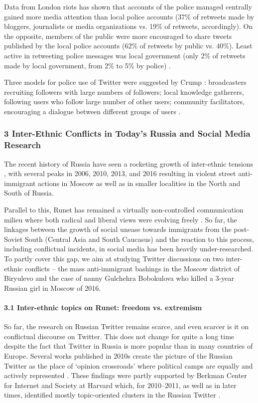 Data from London riots \cite{PalenViewegAnderson} has shown that accounts of the police managed centrally gained more media attention than local police accounts (37\% of retweets made by bloggers, journalists or media organizations vs. 19\% of retweets, accordingly). On the opposite, members of the public were more encouraged to share tweets published by the local police accounts (62\% of retweets by public vs. 40\%). Least active in retweeting police messages was local government (only 2\% of retweets made by local government, from 2\% to 5\% by police) \cite[p.~427]{PanagiotopoulosBarnettBigdeli}.

Three models for police use of Twitter were suggested by Crump \cite{Crowe}: broadcasters recruiting followers with large numbers of followers; local knowledge gatherers, following users who follow large number of other users; community facilitators, encouraging a dialogue between different groups of users \cite{PalenViewegAnderson}.

\subsubsection{3 Inter-Ethnic Conflicts in Today’s Russia and Social Media Research}

The recent history of Russia have seen a rocketing growth of inter-ethnic tensions \cite{BodrunovaBlekanovMaksimov,BodrunovaLitvinenkoGavraYakunin}, with several peaks in 2006, 2010, 2013, and 2016 resulting in violent street anti-immigrant actions in Moscow as well as in smaller localities in the North and South of Russia.

Parallel to this, Runet has remained a virtually non-controlled communication milieu where both radical and liberal views were evolving freely \cite{BarashKelly,SalimovskyErmakova}. So far, the linkages between the growth of social unease towards immigrants from the post-Soviet South (Central Asia and South Caucasus) and the reaction to this process, including conflictual incidents, in social media has been heavily under-researched. To partly cover this gap, we aim at studying Twitter discussions on two inter-ethnic conflicts -- the mass anti-immigrant bashings in the Moscow district of Biryulevo and the case of nanny Gulchehra Bobokulova who killed a 3-year Russian girl in Moscow of 2016.

\paragraph{3.1 Inter-ethnic topics on Runet: freedom vs. extremism}
So far, the research on Russian Twitter remains scarce, and even scarcer is it on conflictual discourse on Twitter. This does not change for quite a long time despite the fact that Twitter in Russia is more popular than in many countries of Europe. Several works published in 2010s create the picture of the Russian Twitter as the place of ‘opinion crossroads’ where political camps are equally and actively represented \cite{Greene,NikiporetsTakigawa}. These findings were partly supported by Berkman Center for Internet and Society at Harvard which, for 2010--2011, as well as in later times, identified mostly topic-oriented clusters in the Russian Twitter \cite{AlexanyanBarashEtling,BarashKelly}.

